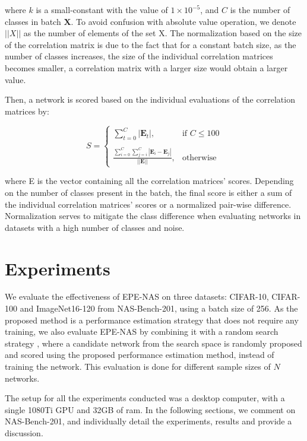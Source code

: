 \documentclass[10pt, conference]{IEEEtran}
\newcommand{\matr}[1]{\mathbf{#1}}
\begin{document}
\noindent where $k$ is a small-constant with the value of $1\times10^{-5}$, and $C$ is the number of classes in batch $\mathbf{X}$. To avoid confusion with absolute value operation, we denote $||X||$ as the number of elements of the set X.
The normalization based on the size of the correlation matrix is due to the fact that for a constant batch size, as the number of classes increases, the size of the individual correlation matrices becomes smaller, a correlation matrix with a larger size would obtain a larger value.

Then, a network is scored based on the individual evaluations of the correlation matrices by:

\begin{equation*}
    S =  
    \begin{cases}
        \sum_{t=0}^{C} |\matr{E}_t|, & \text{if }C \leq 100\\\\
        \frac{\sum_{i=0}^{C}\sum_{j=i}^{C} |\matr{E}_i - \matr{E}_j|}  {||\matr{E}||} , & \text{otherwise}
    \end{cases}
\end{equation*}

\noindent where E is the vector containing all the correlation matrices' scores. Depending on the number of classes present in the batch, the final score is either a sum of the individual correlation matrices' scores or a normalized pair-wise difference. Normalization serves to mitigate the class difference when evaluating networks in datasets with a high number of classes and noise.







\hfill
\section{Experiments}
\label{experiments}
We evaluate the effectiveness of EPE-NAS on three datasets: CIFAR-10, CIFAR-100 and ImageNet16-120 from NAS-Bench-201, using a batch size of 256. As the proposed method is a performance estimation strategy that does not require any training, we also evaluate EPE-NAS by combining it with a random search strategy \cite{li2020random}, where a candidate network from the search space is randomly proposed and scored using the proposed performance estimation method, instead of training the network. This evaluation is done for different sample sizes of $N$ networks.

The setup for all the experiments conducted was a desktop computer, with a single 1080Ti GPU and 32GB of ram. In the following sections, we comment on NAS-Bench-201, and individually detail the experiments, results and provide a discussion.
\end{document}
